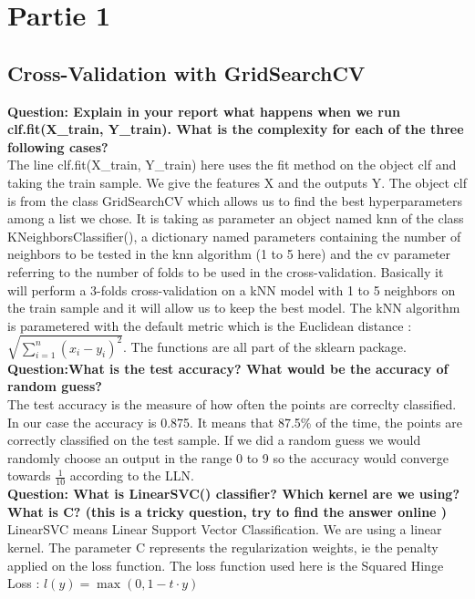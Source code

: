 \section{Partie 1}

\subsection{Cross-Validation with GridSearchCV}
\textbf{{Question}: Explain in your report what happens when we run clf.fit(X\_train, Y\_train). What is the complexity for each of the three following cases?} \\
The line clf.fit(X\_train, Y\_train) here uses the fit method on the object  clf and taking the train sample. We give the features X and the outputs Y. The object clf is from the class GridSearchCV which allows us to find the best hyperparameters among a list we chose. It is taking as parameter an object named knn of the class KNeighborsClassifier(), a dictionary named parameters containing the number of neighbors to be tested in the knn algorithm (1 to 5 here) and the cv parameter referring to the number of folds to be used in the cross-validation. Basically it will perform a 3-folds cross-validation on a kNN model with 1 to 5 neighbors on the train sample and it will allow us to keep the best model. The kNN algorithm is parametered with the default metric which is the Euclidean distance : $\sqrt{\sum^n_{i=1}(x_i - y_i)^2}$. The functions are all part of the sklearn package. \\

\textbf{{Question}:What is the test accuracy? What would be the accuracy of random guess?} \\
The test accuracy is the measure of how often the points are correclty classified. In our case the accuracy is 0.875.  It means that 87.5\% of the time, the points are correctly classified on the test sample. If we did a random guess we would randomly choose an output in the range 0 to 9 so the accuracy would converge towards $\frac{1}{10}$ according to the LLN.  \\


\textbf{{Question}:  What is LinearSVC() classifier? Which kernel are we using? What is C? (this is a tricky question, try to find the answer online )}\\
LinearSVC means Linear Support Vector Classification. We are using a linear kernel. The parameter C represents the regularization weights, ie the penalty applied on the loss function. The loss function used here is the Squared Hinge Loss : $l(y)=\max(0,1-t\cdot y)$ \\

